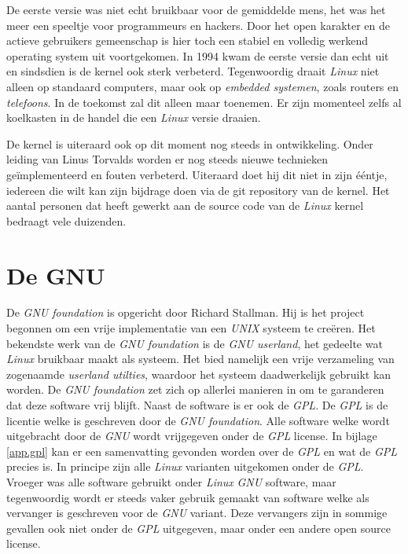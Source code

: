 De eerste versie was niet echt bruikbaar voor de gemiddelde mens, het was het meer een speeltje voor programmeurs en hackers. Door het open karakter en de actieve gebruikers gemeenschap is hier toch een stabiel en volledig werkend operating system uit voortgekomen. In 1994 kwam de eerste versie dan echt uit en sindsdien is de kernel ook sterk verbeterd. Tegenwoordig draait \emph{Linux} niet alleen op standaard computers, maar ook op \emph{embedded systemen}, zoals routers en \emph{telefoons}. In de toekomst zal dit alleen maar toenemen. Er zijn momenteel zelfs al koelkasten in de handel die een \emph{Linux} versie draaien.

De kernel is uiteraard ook op dit moment nog steeds in ontwikkeling. Onder leiding van Linus Torvalds worden er nog steeds nieuwe technieken ge\"{i}mplementeerd en fouten verbeterd. Uiteraard doet hij dit niet in zijn \'{e}\'{e}ntje, iedereen die wilt kan zijn bijdrage doen via de git repository van de kernel. Het aantal personen dat heeft gewerkt aan de source code van de \emph{Linux} kernel bedraagt vele duizenden.

\section{De GNU}
De \emph{GNU foundation} is opgericht door Richard Stallman. Hij is het project begonnen om een vrije implementatie van een \emph{UNIX} systeem te cre\"{e}ren. Het bekendste werk van de \emph{GNU foundation} is de \emph{GNU userland}, het gedeelte wat \emph{Linux} bruikbaar maakt als systeem. Het bied namelijk een vrije verzameling van zogenaamde \emph{userland utilties}, waardoor het systeem daadwerkelijk gebruikt kan worden. De \emph{GNU foundation} zet zich op allerlei manieren in om te garanderen dat deze software vrij blijft. Naast de software is er ook de \emph{GPL}. De \emph{GPL} is de licentie welke is geschreven door de \emph{GNU foundation}. Alle software welke wordt uitgebracht door de \emph{GNU} wordt vrijgegeven onder de \emph{GPL} license. In bijlage \ref{app.gpl} kan er een samenvatting gevonden worden over de \emph{GPL} en wat de \emph{GPL} precies is. In principe zijn alle \emph{Linux} varianten uitgekomen onder de \emph{GPL}. Vroeger was alle software gebruikt onder \emph{Linux} \emph{GNU} software, maar tegenwoordig wordt er steeds vaker gebruik gemaakt van software welke als vervanger is geschreven voor de \emph{GNU} variant. Deze vervangers zijn in sommige gevallen ook niet onder de \emph{GPL} uitgegeven, maar onder een andere open source license.

